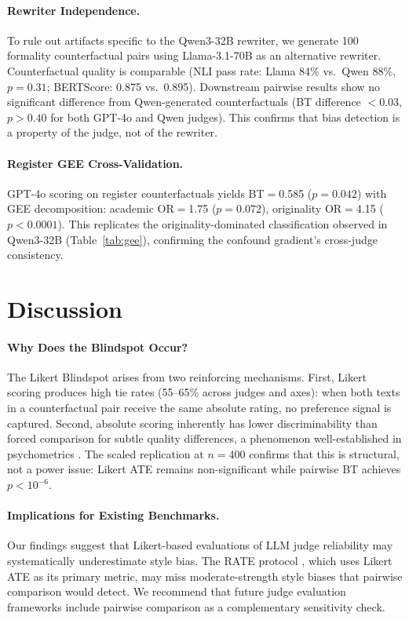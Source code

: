 \documentclass[10pt,twocolumn]{article}
\begin{document}
\paragraph{Rewriter Independence.}
To rule out artifacts specific to the Qwen3-32B rewriter, we generate 100 formality counterfactual pairs using Llama-3.1-70B as an alternative rewriter.
Counterfactual quality is comparable (NLI pass rate: Llama 84\% vs.\ Qwen 88\%, $p=0.31$; BERTScore: 0.875 vs.\ 0.895).
Downstream pairwise results show no significant difference from Qwen-generated counterfactuals (BT difference $<$0.03, $p>0.40$ for both GPT-4o and Qwen judges).
This confirms that bias detection is a property of the judge, not of the rewriter.

\paragraph{Register GEE Cross-Validation.}
GPT-4o scoring on register counterfactuals yields BT$=$0.585 ($p=0.042$) with GEE decomposition: academic OR$=$1.75 ($p=0.072$), originality OR$=$4.15 ($p<0.0001$).
This replicates the originality-dominated classification observed in Qwen3-32B (Table~\ref{tab:gee}), confirming the confound gradient's cross-judge consistency.

\section{Discussion}\label{sec:discussion}

\paragraph{Why Does the Blindspot Occur?}
The Likert Blindspot arises from two reinforcing mechanisms.
First, Likert scoring produces high tie rates (55--65\% across judges and axes): when both texts in a counterfactual pair receive the same absolute rating, no preference signal is captured.
Second, absolute scoring inherently has lower discriminability than forced comparison for subtle quality differences, a phenomenon well-established in psychometrics \citep{decoster2011,stevens1946}.
The scaled replication at $n=400$ confirms that this is structural, not a power issue: Likert ATE remains non-significant while pairwise BT achieves $p<10^{-6}$.

\paragraph{Implications for Existing Benchmarks.}
Our findings suggest that Likert-based evaluations of LLM judge reliability may systematically underestimate style bias.
The RATE protocol \citep{rate2025}, which uses Likert ATE as its primary metric, may miss moderate-strength style biases that pairwise comparison would detect.
We recommend that future judge evaluation frameworks include pairwise comparison as a complementary sensitivity check.
\end{document}

